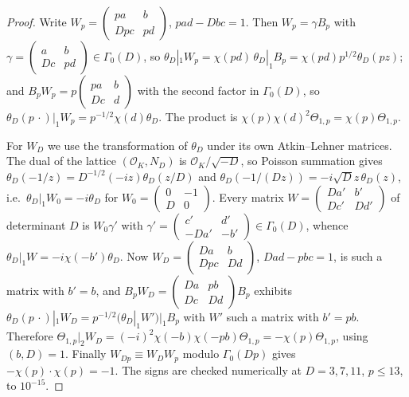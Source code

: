 \documentclass[11pt]{amsart}
\theoremstyle{remark}
\begin{document}
\begin{proof}
Write $W_p=\left(\begin{smallmatrix}pa&b\\Dpc&pd\end{smallmatrix}\right)$, $pad-Dbc=1$. Then $W_p=\gamma B_p$ with $\gamma=\left(\begin{smallmatrix}a&b\\Dc&pd\end{smallmatrix}\right)\in\Gamma_0(D)$, so $\theta_D|_1W_p=\chi(pd)\,\theta_D|_1B_p=\chi(pd)p^{1/2}\theta_D(pz)$; and $B_pW_p=p\left(\begin{smallmatrix}pa&b\\Dc&d\end{smallmatrix}\right)$ with the second factor in $\Gamma_0(D)$, so $\theta_D(p\,\cdot)|_1W_p=p^{-1/2}\chi(d)\theta_D$. The product is $\chi(p)\chi(d)^2\Theta_{1,p}=\chi(p)\Theta_{1,p}$.

For $W_D$ we use the transformation of $\theta_D$ under its own Atkin--Lehner matrices. The dual of the lattice $(\mathcal O_K,N_D)$ is $\mathcal O_K/\sqrt{-D}$, so Poisson summation gives $\theta_D(-1/z)=D^{-1/2}(-iz)\theta_D(z/D)$ and $\theta_D(-1/(Dz))=-i\sqrt Dz\,\theta_D(z)$, i.e.\ $\theta_D|_1W_0=-i\theta_D$ for $W_0=\left(\begin{smallmatrix}0&-1\\D&0\end{smallmatrix}\right)$. Every matrix $W=\left(\begin{smallmatrix}Da'&b'\\Dc'&Dd'\end{smallmatrix}\right)$ of determinant $D$ is $W_0\gamma'$ with $\gamma'=\left(\begin{smallmatrix}c'&d'\\-Da'&-b'\end{smallmatrix}\right)\in\Gamma_0(D)$, whence $\theta_D|_1W=-i\chi(-b')\theta_D$. Now $W_D=\left(\begin{smallmatrix}Da&b\\Dpc&Dd\end{smallmatrix}\right)$, $Dad-pbc=1$, is such a matrix with $b'=b$, and $B_pW_D=\left(\begin{smallmatrix}Da&pb\\Dc&Dd\end{smallmatrix}\right)B_p$ exhibits $\theta_D(p\,\cdot)|_1W_D=p^{-1/2}(\theta_D|_1W')|_1B_p$ with $W'$ such a matrix with $b'=pb$. Therefore $\Theta_{1,p}|_2W_D=(-i)^2\chi(-b)\chi(-pb)\Theta_{1,p}=-\chi(p)\Theta_{1,p}$, using $(b,D)=1$. Finally $W_{Dp}\equiv W_DW_p$ modulo $\Gamma_0(Dp)$ gives $-\chi(p)\cdot\chi(p)=-1$. The signs are checked numerically at $D=3,7,11$, $p\le13$, to $10^{-15}$.
\end{proof}
\end{document}
